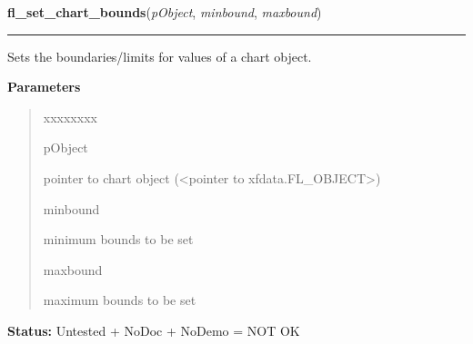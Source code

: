 \hspace{.8\funcindent}\begin{boxedminipage}{\funcwidth}

    \raggedright \textbf{fl\_set\_chart\_bounds}(\textit{pObject}, \textit{minbound}, \textit{maxbound})

    \vspace{-1.5ex}

    \rule{\textwidth}{0.5\fboxrule}
\setlength{\parskip}{2ex}
    Sets the boundaries/limits for values of a chart object.

\setlength{\parskip}{1ex}
      \textbf{Parameters}
      \vspace{-1ex}

      \begin{quote}
        \begin{Ventry}{xxxxxxxx}

          \item[pObject]

          pointer to chart object ({\textless}pointer to 
          xfdata.FL\_OBJECT{\textgreater})

          \item[minbound]

          minimum bounds to be set

          \item[maxbound]

          maximum bounds to be set

        \end{Ventry}

      \end{quote}

\textbf{Status:} Untested + NoDoc + NoDemo = NOT OK



    \end{boxedminipage}

    \label{xformslib:library:fl_get_chart_bounds}

    \vspace{0.5ex}

